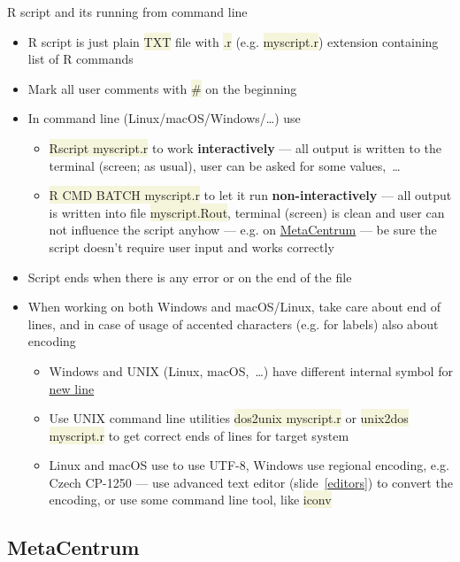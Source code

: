 \documentclass[compress, xelatex, 11pt, xcolor=svgnames, aspectratio=169,
	hyperref={
		bookmarks=true,
		unicode=true,
		colorlinks=true,
		pdftitle={Molecular data in R},
		plainpages=false,
		pdfauthor={Vojtech Zeisek},
		pdfsubject={Course about phylogeny and evolution in R},
		pdfcreator={XeLaTeX},
		pdfkeywords={R, evolution, phylogeny, molecular data},
		linkcolor=Crimson, %
		anchorcolor=Magenta, %
		citecolor=Magenta, %
		filecolor=Magenta, %
		menucolor=Magenta, %
		urlcolor=DodgerBlue, %
		},
	url={hyphens, lowtilde} %
	]{beamer}
\renewcommand{\texttt}[1]{\colorbox{Beige}{{\ttfamily #1}}}
\begin{document}
\begin{frame}[allowframebreaks]{R script and its running from command line}
	\begin{itemize}
		\item R script is just plain \texttt{TXT} file with \texttt{.r} (e.g. \texttt{myscript.r}) extension containing list of R commands
		\item Mark all user comments with \texttt{\#} on the beginning
		\item In command line (Linux/macOS/Windows/\ldots) use
		\begin{itemize}
			\item \texttt{Rscript myscript.r} to work \textbf{interactively} --- all output is written to the terminal (screen; as usual), user can be asked for some values,~\ldots
			\item \texttt{R CMD BATCH myscript.r} to let it run \textbf{non-interactively} --- all output is written into file \texttt{myscript.Rout}, terminal (screen) is clean and user can not influence the script anyhow --- e.g. on \href{https://www.metacentrum.cz/}{MetaCentrum} --- be sure the script doesn't require user input and works correctly
		\end{itemize}
		\item Script ends when there is any error or on the end of the file
		\item When working on both Windows and macOS/Linux, take care about end of lines, and in case of usage of accented characters (e.g. for labels) also about encoding
		\begin{itemize}
			\item Windows and UNIX (Linux, macOS,~\ldots) have different internal symbol for \href{https://en.wikipedia.org/wiki/Newline}{new line}
			\item Use UNIX command line utilities \texttt{dos2unix myscript.r} or \texttt{unix2dos myscript.r} to get correct ends of lines for target system
			\item Linux and macOS use to use UTF-8, Windows use regional encoding, e.g. Czech CP-1250 --- use advanced text editor (slide~\ref{editors}) to convert the encoding, or use some command line tool, like \texttt{iconv}
		\end{itemize}
	\end{itemize}
\end{frame}

\subsection{MetaCentrum}
\end{document}
